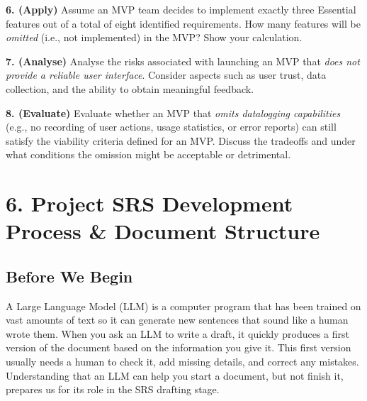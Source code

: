 \documentclass[12pt, a4paper]{article}
\begin{document}
\newpage
\textbf{6. (Apply)} Assume an MVP team decides to implement exactly three Essential features out of a total of eight identified requirements.  
How many features will be \emph{omitted} (i.e., not implemented) in the MVP? Show your calculation.  

\newpage
\textbf{7. (Analyse)} Analyse the risks associated with launching an MVP that \emph{does not provide a reliable user interface}. Consider aspects such as user trust, data collection, and the ability to obtain meaningful feedback.  

\newpage
\textbf{8. (Evaluate)} Evaluate whether an MVP that \emph{omits datalogging capabilities} (e.g., no recording of user actions, usage statistics, or error reports) can still satisfy the viability criteria defined for an MVP. Discuss the tradeoffs and under what conditions the omission might be acceptable or detrimental.  

\newpage

\newpage

\section{6. Project SRS Development Process \& Document Structure}

\subsection{Before We Begin}
A Large Language Model (LLM) is a computer program that has been trained on vast amounts of text so it can generate new sentences that sound like a human wrote them. When you ask an LLM to write a draft, it quickly produces a first version of the document based on the information you give it. This first version usually needs a human to check it, add missing details, and correct any mistakes. Understanding that an LLM can help you start a document, but not finish it, prepares us for its role in the SRS drafting stage.  
\end{document}
